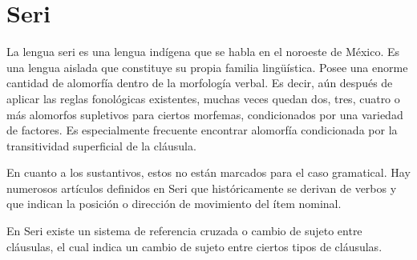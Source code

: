 \section*{Seri}

\noindent La lengua seri es una lengua indígena que se habla en el noroeste de México. Es una lengua aislada que constituye su propia familia lingüística. Posee una enorme cantidad de alomorfía dentro de la morfología verbal. Es decir, aún después de aplicar las reglas fonológicas existentes, muchas veces quedan dos, tres, cuatro o más alomorfos supletivos para ciertos morfemas, condicionados por una variedad de factores. Es especialmente frecuente encontrar alomorfía condicionada por la transitividad superficial de la cláusula.

En cuanto a los sustantivos, estos no están marcados para el caso gramatical. Hay numerosos artículos definidos en Seri que históricamente se derivan de verbos y que indican la posición o dirección de movimiento del ítem nominal.

En Seri existe un sistema de referencia cruzada o cambio de sujeto entre cláusulas, el cual indica un cambio de sujeto entre ciertos tipos de cláusulas. \vspace{0.5cm}

